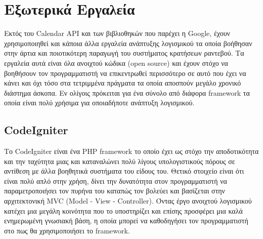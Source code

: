 
\chapter{Εξωτερικά Εργαλεία}
Εκτός του Calendar API και των βιβλιοθηκών που παρέχει η Google, έχουν χρησιμοποιηθεί και κάποια άλλα εργαλεία ανάπτυξης λογισμικού τα οποία βοήθησαν στην άρτια και ποιοτικότερη παραγωγή του συστήματος κρατήσεων ραντεβού. Τα εργαλεία αυτά είναι όλα ανοιχτού κώδικα (open source) και έχουν στόχο να βοηθήσουν τον προγραμματιστή να επικεντρωθεί περισσότερο σε αυτό που έχει να κάνει και όχι τόσο στα τετριμμένα πράγματα τα οποία αποσπούν μεγάλο χρονικό διάστημα άσκοπα. Εν ολίγοις πρόκειται για ένα σύνολο από διάφορα framework τα οποία είναι πολύ χρήσιμα για οποιαδήποτε ανάπτυξη λογισμικού.

\section{CodeIgniter}
Το CodeIgniter είναι ένα PHP framework το οποίο έχει ως στόχο την αποδοτικότητα και την ταχύτητα μιας και καταναλώνει πολύ λίγους υπολογιστικούς πόρους σε αντίθεση με άλλα βοηθητικά συστήματα του είδους του. Θετικό στοιχείο είναι ότι είναι πολύ απλό στην χρήση, δίνει την δυνατότητα στον προγραμματιστή να παραμετροποιήσει τον πυρήνα του καταπώς τον βολεύει και βασίζεται στην αρχιτεκτονική MVC (Model - View - Controller). Όντας έργο ανοιχτού λογισμικού κατέχει μια μεγάλη κοινότητα που το υποστηρίζει και επίσης προσφέρει μια καλά ενημερωμένη γνωσιακή βάση, η οποία μπορεί να καθοδηγήσει τον προγραμματιστή στο πως θα χρησιμοποιήσει το framework.

